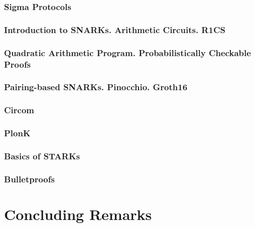 \documentclass{zkdl-template}
\begin{document}
    \section{Sigma Protocols}\label{section:sigma}
    

    \section[Arithmetic Circuits. R1CS]{Introduction to SNARKs. Arithmetic Circuits. R1CS} \label{section:r1cs}
    \label{section:circuits}

    \section[Quadratic Arithmetic Program]{Quadratic Arithmetic Program. Probabilistically Checkable Proofs}\label{section:qap-pcp}
    

    \section[Pairing-based SNARKs]{Pairing-based SNARKs. Pinocchio. Groth16}\label{section:groth}
    

    \section{Circom}\label{section:circom}
    

    \section{PlonK}\label{section:plonk}
    

    \section{Basics of STARKs}\label{section:stark}
    

    \section{Bulletproofs}\label{section:bulletproofs}
    
    
    \part{Concluding Remarks}\label{section:solutions}
\end{document}
